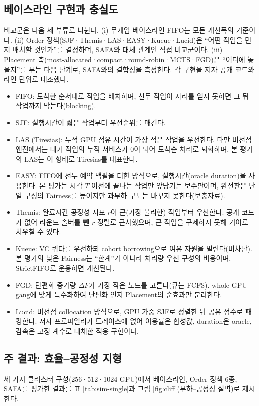 \documentclass{ieeetj}
\begin{document}
\subsection{베이스라인 구현과 충실도}\label{eval:impl}
비교군은 다음 세 부류로 나뉜다. (i) 무개입 베이스라인 FIFO는 모든 개선폭의 기준이다. (ii) Order 정책(SJF·Themis·LAS·EASY·Kueue·Lucid)은 ``어떤 작업을 먼저 배치할 것인가''를 결정하며, SAFA와 대체 관계인 직접 비교군이다. (iii) Placement 축(most-allocated·compact·round-robin·MCTS·FGD)은 ``어디에 놓을지''를 푸는 다음 단계로, SAFA와의 결합성을 측정한다. 각 구현을 저자 공개 코드와 라인 단위로 대조했다. 
\begin{itemize}
\item FIFO: 도착한 순서대로 작업을 배치하며, 선두 작업이 자리를 얻지 못하면 그 뒤 작업까지 막는다(blocking).
\item SJF: 실행시간이 짧은 작업부터 우선순위를 매긴다.
\item LAS (Tiresias): 누적 GPU 점유 시간이 가장 적은 작업을 우선한다. 다만 비선점 엔진에서는 대기 작업의 누적 서비스가 0이 되어 도착순 처리로 퇴화하며, 본 평가의 LAS는 이 형태로 Tiresias를 대표한다.
\item EASY: FIFO에 선두 예약 백필을 더한 방식으로, 실행시간(oracle duration)을 사용한다. 본 평가는 시각 $T$ 이전에 끝나는 작업만 앞당기는 보수판이며, 완전판은 단일 구성의 Fairness를 높이지만 과부하 구도는 바꾸지 못한다(보충자료).
\item Themis: 완료시간 공정성 지표 $r$이 큰(가장 불리한) 작업부터 우선한다. 공개 코드가 없어 라운드 솔버를 뺀 $r$-정렬로 근사했으며, 큰 작업을 구제하지 못해 기아로 치우칠 수 있다.
\item Kueue: VC 쿼타를 우선하되 cohort borrowing으로 여유 자원을 빌린다(비차단). 본 평가의 낮은 Fairness는 ``한계''가 아니라 처리량 우선 구성의 비용이며, StrictFIFO로 운용하면 개선된다.
\item FGD: 단편화 증가량 $\Delta F$가 가장 작은 노드를 고른다(큐는 FCFS). whole-GPU gang에 맞게 특수화하여 단편화 인지 Placement의 순효과만 분리한다.
\item Lucid: 비선점 collocation 방식으로, GPU 가중 SJF로 정렬한 뒤 공유 점수로 패킹한다. 저자 프로파일러가 트레이스에 없어 이용률은 합성값, duration은 oracle, 감속은 고정 계수로 대체한 적응 구현이다.
\end{itemize}

\subsection{주 결과: 효율--공정성 지형}\label{eval:main}
세 가지 클러스터 구성(256·512·1024 GPU)에서 베이스라인, Order 정책 6종, SAFA를 평가한 결과를 표 \ref{tab:sim-single}과 그림 \ref{fig:cliff}(부하--공정성 절벽)로 제시한다.
\end{document}

